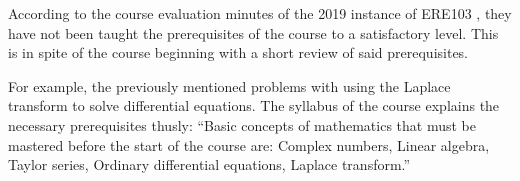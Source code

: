 \begin{modtext}
According to the course evaluation minutes of the 2019 instance of \gls{ERE103} \cite{ere103_minutes}, they have not been taught the prerequisites of the course to a satisfactory level. This is in spite of the course beginning with a short review of said prerequisites.
\end{modtext}
\iffalse
\begin{modtext}
The minutes of the course evaluation of the 2019 instance of the course \cite{ere103_minutes} mention
\end{modtext}
that although the course starts with a review of the prerequisite material needed, students have reported that they have not been taught some of the prerequisites to a satisfactory level;\fi
For example, the previously mentioned problems with using the Laplace transform to solve differential equations. 
The syllabus \cite{ERE103} of the course explains the necessary prerequisites thusly:
``Basic concepts of mathematics that must be mastered before the start of the course are: Complex numbers, Linear algebra, Taylor series, Ordinary differential equations, Laplace transform.'' 





